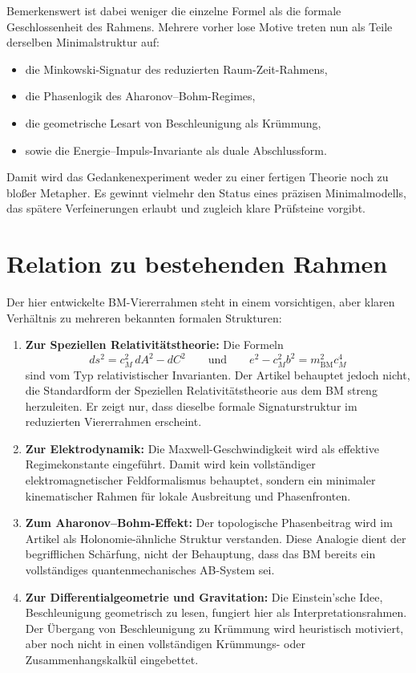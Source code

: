 \documentclass[11pt,a4paper]{article}
\theoremstyle{definition}
\theoremstyle{plain}
\begin{document}
	Bemerkenswert ist dabei weniger die einzelne Formel als die formale Geschlossenheit des Rahmens. Mehrere vorher lose Motive treten nun als Teile derselben Minimalstruktur auf:
	\begin{itemize}[leftmargin=2em]
		\item die Minkowski-Signatur des reduzierten Raum-Zeit-Rahmens,
		\item die Phasenlogik des Aharonov--Bohm-Regimes,
		\item die geometrische Lesart von Beschleunigung als Krümmung,
		\item sowie die Energie--Impuls-Invariante als duale Abschlussform.
	\end{itemize}
	
	Damit wird das Gedankenexperiment weder zu einer fertigen Theorie noch zu bloßer Metapher. Es gewinnt vielmehr den Status eines präzisen Minimalmodells, das spätere Verfeinerungen erlaubt und zugleich klare Prüfsteine vorgibt.
	
	\section{Relation zu bestehenden Rahmen}
	
	Der hier entwickelte BM-Viererrahmen steht in einem vorsichtigen, aber klaren Verhältnis zu mehreren bekannten formalen Strukturen:
	\begin{enumerate}[leftmargin=2em]
		\item \textbf{Zur Speziellen Relativitätstheorie:} Die Formeln
		\[
		ds^2 = c_M^2\, dA^2 - dC^2
		\qquad\text{und}\qquad
		e^2 - c_M^2 b^2 = m_{\mathrm{BM}}^2 c_M^4
		\]
		sind vom Typ relativistischer Invarianten. Der Artikel behauptet jedoch nicht, die Standardform der Speziellen Relativitätstheorie aus dem BM streng herzuleiten. Er zeigt nur, dass dieselbe formale Signaturstruktur im reduzierten Viererrahmen erscheint.
		\item \textbf{Zur Elektrodynamik:} Die Maxwell-Geschwindigkeit wird als effektive Regimekonstante eingeführt. Damit wird kein vollständiger elektromagnetischer Feldformalismus behauptet, sondern ein minimaler kinematischer Rahmen für lokale Ausbreitung und Phasenfronten.
		\item \textbf{Zum Aharonov--Bohm-Effekt:} Der topologische Phasenbeitrag wird im Artikel als Holonomie-ähnliche Struktur verstanden. Diese Analogie dient der begrifflichen Schärfung, nicht der Behauptung, dass das BM bereits ein vollständiges quantenmechanisches AB-System sei.
		\item \textbf{Zur Differentialgeometrie und Gravitation:} Die Einstein’sche Idee, Beschleunigung geometrisch zu lesen, fungiert hier als Interpretationsrahmen. Der Übergang von Beschleunigung zu Krümmung wird heuristisch motiviert, aber noch nicht in einen vollständigen Krümmungs- oder Zusammenhangskalkül eingebettet.
	\end{enumerate}
	
\end{document}
